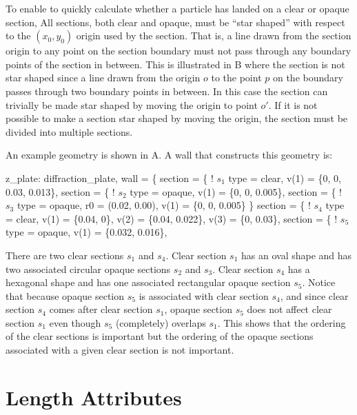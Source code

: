 To enable \bmad to quickly calculate whether a particle has landed on a clear or opaque section, All
sections, both clear and opaque, must be ``star shaped'' with respect to the $(x_0, y_0)$ origin
used by the section. That is, a line drawn from the section origin to any point on the section
boundary must not pass through any boundary points of the section in between. This is illustrated in
B where the section is not star shaped since a line drawn from the origin $o$ to
the point $p$ on the boundary passes through two boundary points in between. In this case the
section can trivially be made star shaped by moving the origin to point $o'$. If it is not possible
to make a section star shaped by moving the origin, the section must be divided into multiple
sections.

An example geometry is shown in A. A wall that constructs this geometry is:
\begin{example}
  z_plate: diffraction_plate, wall = \{
    section = \{          ! $s_1$ 
      type = clear,
      v(1) = \{0, 0, 0.03, 0.013\},
    section = \{          ! $s_2$
      type = opaque,
      v(1) = \{0, 0, 0.005\},
    section = \{          ! $s_3$
      type = opaque,
      r0 = (0.02, 0.00),
      v(1) = \{0, 0, 0.005\} \}
    section = \{          ! $s_4$
      type = clear, 
      v(1) = \{0.04, 0\}, v(2) = \{0.04, 0.022\},
      v(3) = \{0, 0.03\},
    section = \{          ! $s_5$
      type = opaque,
      v(1) = \{0.032, 0.016\},
\end{example}
There are two clear sections $s_1$ and $s_4$. Clear section $s_1$ has an oval shape and has two
associated circular opaque sections $s_2$ and $s_3$. Clear section $s_4$ has a hexagonal shape and
has one associated rectangular opaque section $s_5$. Notice that because opaque section $s_5$ is
associated with clear section $s_4$, and since clear section $s_4$ comes after clear section $s_1$,
opaque section $s_5$ does not affect clear section $s_1$ even though $s_5$ (completely) overlaps
$s_1$. This shows that the ordering of the clear sections is important but the ordering of the
opaque sections associated with a given clear section is not important.

\section{Length Attributes}
\label{s:l}

